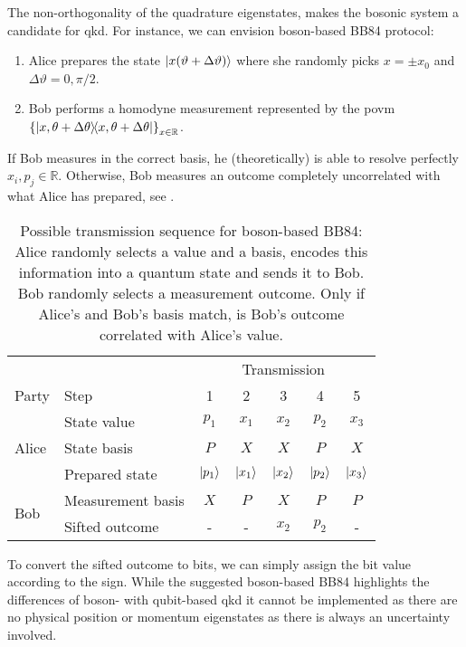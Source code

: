 The non-orthogonality of the quadrature eigenstates, makes the bosonic system a candidate for \gls{qkd}.
For instance, we can envision boson-based BB84 protocol:
\begin{enumerate}
	\item Alice prepares the state $\ket{x(\vartheta+\Delta\vartheta)}$ where she randomly picks $x=\pm x_0$ and $\Delta\vartheta=0,\pi/2$.
	\item Bob performs a homodyne measurement represented by the \gls{povm} $\left\{\ketbra{x,\theta+\Delta\theta}\right\}_{x\in\mathbb{R}}$.
\end{enumerate}
If Bob measures in the correct basis, he (theoretically) is able to resolve perfectly $x_i,p_j\in\mathbb{R}$.
Otherwise, Bob measures an outcome completely uncorrelated with what Alice has prepared, see .
\begin{table}[htb]
	\centering
	\begin{tabular}{llccccc}
		\toprule
		& & \multicolumn{5}{c}{Transmission} \\
		\cmidrule{3-7}
		Party & Step & 1 & 2 & 3 & 4 & 5 \\ 
		\midrule
		\multirow{3}{*}{Alice} & State value & $p_1$ & $x_1$ & $x_2$ & $p_2$ & $x_3$ \\
		& State basis & $P$ & $X$ & $X$ & $P$ & $X$ \\
		& Prepared state & $\ket{p_1}$ & $\ket{x_1}$ & $\ket{x_2}$ & $\ket{p_2}$ & $\ket{x_3}$ \\
		\cmidrule{1-1}
		\multirow{2}{*}{Bob} & Measurement basis & $X$ & $P$ & $X$ & $P$ & $P$ \\
		& Sifted outcome & - & - & $x_2$ & $p_2$ & - \\
		\bottomrule
	\end{tabular}
	\caption{Possible transmission sequence for boson-based BB84: Alice randomly selects a value and a basis, encodes this information into a quantum state and sends it to Bob. Bob randomly selects a measurement outcome. Only if Alice's and Bob's basis match, is Bob's outcome correlated with Alice's value.}\label{tab:boson_transmission_sequence}
\end{table}
To convert the sifted outcome to bits, we can simply assign the bit value according to the sign.
While the suggested boson-based BB84 highlights the differences of boson- with qubit-based \gls{qkd} it cannot be implemented as there are no physical position or momentum eigenstates as there is always an uncertainty involved.


